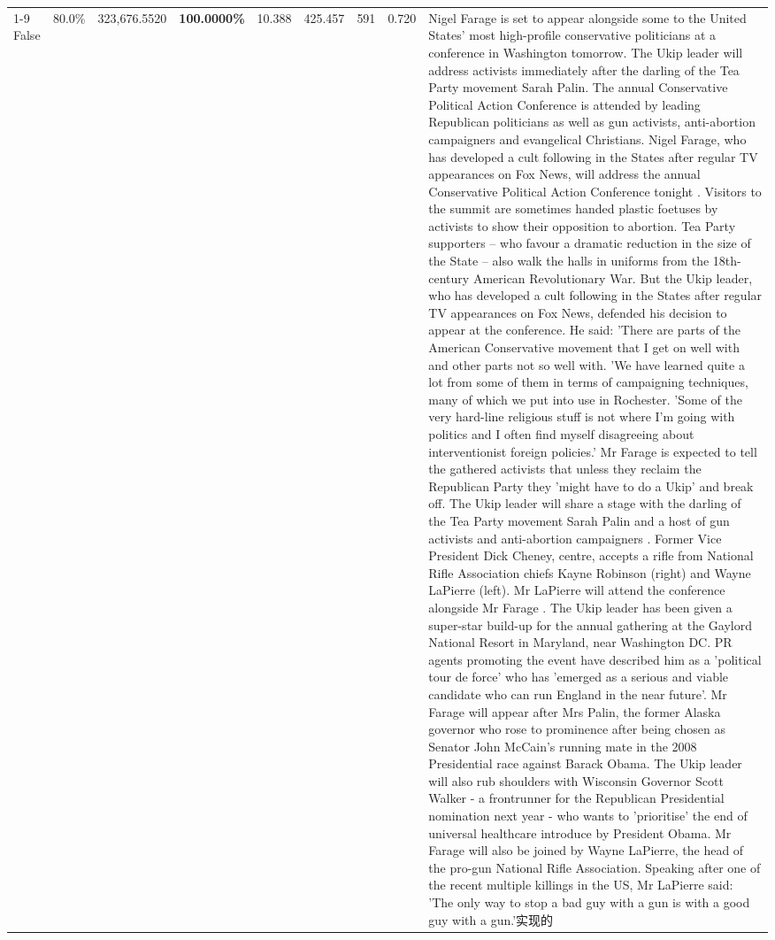 \begin{table}[H]
\begin{tabular}{lllrlllll}
\cline{1-9}
False & 80.0\% & 323,676.5520 & \bfseries \color{red} 100.0000\% & 10.388 & 425.457 & 591 & 0.720 & Nigel Farage is set to appear alongside some to the United States' most high-profile conservative politicians at a conference in Washington tomorrow. The Ukip leader will address activists immediately after the darling of the Tea Party movement Sarah Palin. The annual Conservative Political Action Conference is attended by leading Republican politicians as well as gun activists, anti-abortion campaigners and evangelical Christians. Nigel Farage, who has developed a cult following in the States after regular TV appearances on Fox News, will address the annual Conservative Political Action Conference tonight . Visitors to the summit are sometimes handed plastic foetuses by activists to show their opposition to abortion. Tea Party supporters – who favour a dramatic reduction in the size of the State – also walk the halls in uniforms from the 18th-century American Revolutionary War. But the Ukip leader, who has developed a cult following in the States after regular TV appearances on Fox News, defended his decision to appear at the conference. He said: 'There are parts of the American Conservative movement that I get on well with and other parts not so well with. 'We have learned quite a lot from some of them in terms of campaigning techniques, many of which we put into use in Rochester. 'Some of the very hard-line religious stuff is not where I'm going with politics and I often find myself disagreeing about interventionist foreign policies.' Mr Farage is expected to tell the gathered activists that unless they reclaim the Republican Party they 'might have to do a Ukip' and break off. The Ukip leader will share a stage with the darling of the Tea Party movement Sarah Palin and a host of gun activists and anti-abortion campaigners . Former Vice President Dick Cheney, centre, accepts a rifle from National Rifle Association chiefs Kayne Robinson (right) and Wayne LaPierre (left). Mr LaPierre will attend the conference alongside Mr Farage . The Ukip leader has been given a super-star build-up for the annual gathering at the Gaylord National Resort in Maryland, near Washington DC. PR agents promoting the event have described him as a 'political tour de force' who has 'emerged as a serious and viable candidate who can run England in the near future'. Mr Farage will appear after Mrs Palin, the former Alaska governor who rose to prominence after being chosen as Senator John McCain's running mate in the 2008 Presidential race against Barack Obama. The Ukip leader will also rub shoulders with Wisconsin Governor Scott Walker - a frontrunner for the Republican Presidential nomination next year - who wants to 'prioritise' the end of universal healthcare introduce by President Obama. Mr Farage will also be joined by Wayne LaPierre, the head of the pro-gun National Rifle Association. Speaking after one of the recent multiple killings in the US, Mr LaPierre said: 'The only way to stop a bad guy with a gun is with a good guy with a gun.'实现的 \\

\end{tabular}
\end{table}
